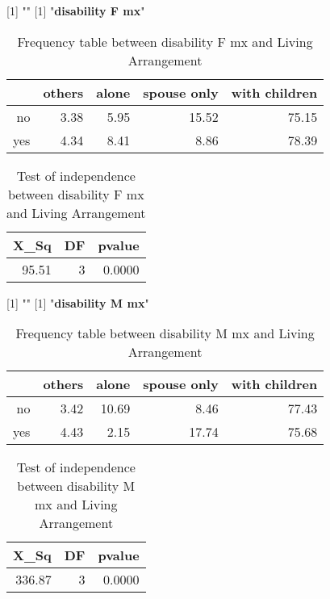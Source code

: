 \documentclass[11pt]{article}
\begin{document}
[1] "\newline"
[1] "{\bf{disability F mx}}"
\begin{table}[H]
\centering
\begin{tabular}{rrrrr}
  \hline
 & others & alone & spouse only & with children \\ 
  \hline
no & 3.38 & 5.95 & 15.52 & 75.15 \\ 
  yes & 4.34 & 8.41 & 8.86 & 78.39 \\ 
   \hline
\end{tabular}
\caption{Frequency table between disability F mx and Living Arrangement} 
\end{table}
\begin{table}[H]
\centering
\begin{tabular}{rrr}
  \hline
X\_Sq & DF & pvalue \\ 
  \hline
95.51 & 3 & 0.0000 \\ 
   \hline
\end{tabular}
\caption{Test of independence between disability F mx and Living Arrangement} 
\end{table}
[1] "\newline"
[1] "{\bf{disability M mx}}"
\begin{table}[H]
\centering
\begin{tabular}{rrrrr}
  \hline
 & others & alone & spouse only & with children \\ 
  \hline
no & 3.42 & 10.69 & 8.46 & 77.43 \\ 
  yes & 4.43 & 2.15 & 17.74 & 75.68 \\ 
   \hline
\end{tabular}
\caption{Frequency table between disability M mx and Living Arrangement} 
\end{table}
\begin{table}[H]
\centering
\begin{tabular}{rrr}
  \hline
X\_Sq & DF & pvalue \\ 
  \hline
336.87 & 3 & 0.0000 \\ 
   \hline
\end{tabular}
\caption{Test of independence between disability M mx and Living Arrangement} 
\end{table}
\end{document}
